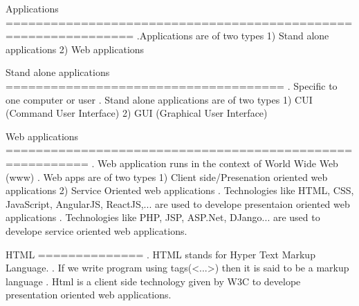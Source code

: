 Applications
===============================================================
.Applications are of two types
  1) Stand alone applications
  2) Web applications 

Stand alone applications
=====================================
. Specific to one computer or user
. Stand alone applications are of two types
  1) CUI (Command User Interface)
  2) GUI (Graphical User Interface)

Web applications
=========================================================
. Web application runs in the context of World Wide Web (www)
. Web apps are of two types
  1) Client side/Presenation oriented web applications
  2) Service Oriented web applications
. Technologies like HTML, CSS, JavaScript, AngularJS, ReactJS,... are used to develope presentaion oriented web applications
. Technologies like PHP, JSP, ASP.Net, DJango... are used to develope service oriented web applications.

HTML
==============
. HTML stands for Hyper Text Markup Language.
. If we write program using tags(<...>) then it is said to be a markup language
. Html is a client side technology given by W3C to develope presentation oriented web applications.



